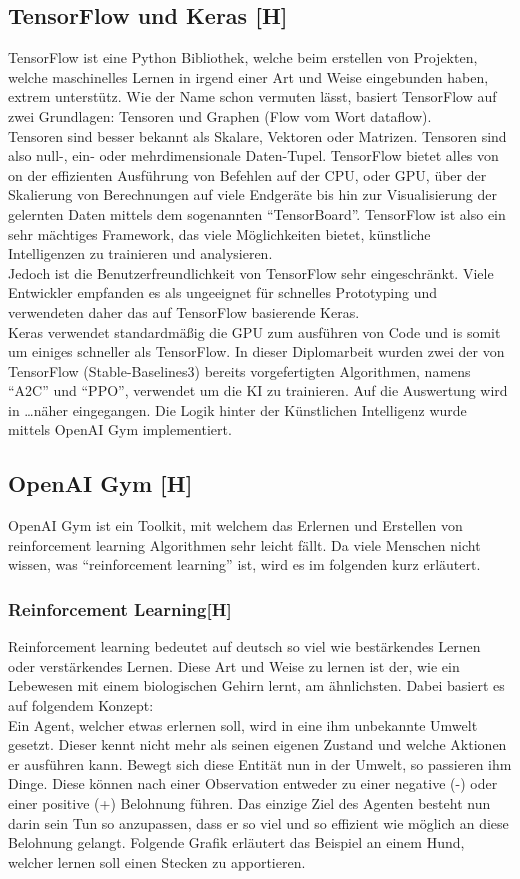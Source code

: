 \subsection{TensorFlow und Keras [H]}
TensorFlow ist eine Python Bibliothek, welche beim erstellen von Projekten, welche maschinelles Lernen
in irgend einer Art und Weise eingebunden haben, extrem unterstütz.
Wie der Name schon vermuten lässt, basiert TensorFlow auf zwei Grundlagen: Tensoren und Graphen (Flow
vom Wort dataflow). \\
Tensoren sind besser bekannt als Skalare, Vektoren oder Matrizen. Tensoren sind also
null-, ein- oder mehrdimensionale Daten-Tupel.
TensorFlow bietet alles von on der effizienten Ausführung von
Befehlen auf der CPU, oder GPU, über der Skalierung von Berechnungen auf viele Endgeräte bis hin
zur Visualisierung der gelernten Daten mittels dem sogenannten ``TensorBoard''. TensorFlow ist also ein
sehr mächtiges Framework, das viele Möglichkeiten bietet, künstliche Intelligenzen zu trainieren und
analysieren.\\
Jedoch ist die Benutzerfreundlichkeit von TensorFlow sehr eingeschränkt. Viele Entwickler empfanden
es als ungeeignet für schnelles Prototyping und verwendeten daher das auf TensorFlow basierende Keras. \\
Keras verwendet standardmäßig die GPU zum ausführen von Code und is somit um einiges schneller als TensorFlow.
In dieser Diplomarbeit wurden zwei der von TensorFlow (Stable-Baselines3) bereits vorgefertigten Algorithmen,
namens ``A2C'' und ``PPO'', verwendet um die KI zu trainieren. Auf die Auswertung wird in \dots näher
eingegangen. Die Logik hinter der Künstlichen Intelligenz
wurde mittels OpenAI Gym implementiert.

\subsection{OpenAI Gym [H]}
OpenAI Gym ist ein Toolkit, mit welchem das Erlernen und Erstellen von reinforcement learning Algorithmen
sehr leicht fällt. Da viele Menschen nicht wissen, was ``reinforcement learning'' ist, wird es im folgenden
kurz erläutert.

\subsubsection{Reinforcement Learning[H]}
Reinforcement learning bedeutet auf deutsch so viel wie bestärkendes Lernen oder verstärkendes Lernen.
Diese Art und Weise zu lernen ist der, wie ein Lebewesen mit einem biologischen Gehirn
lernt, am ähnlichsten.
Dabei basiert es auf folgendem Konzept: \\
Ein Agent, welcher etwas erlernen soll, wird in eine ihm unbekannte Umwelt gesetzt. Dieser kennt nicht mehr
als seinen eigenen Zustand und welche Aktionen er ausführen kann. Bewegt sich diese Entität nun in der
Umwelt, so passieren ihm Dinge. Diese können nach einer Observation entweder zu einer negative (-) oder einer
positive (+) Belohnung führen. Das einzige Ziel des Agenten besteht nun darin sein Tun so anzupassen, dass
er so viel und so
effizient wie möglich an diese Belohnung gelangt. Folgende Grafik erläutert das Beispiel an einem Hund,
welcher lernen soll einen Stecken zu apportieren.

